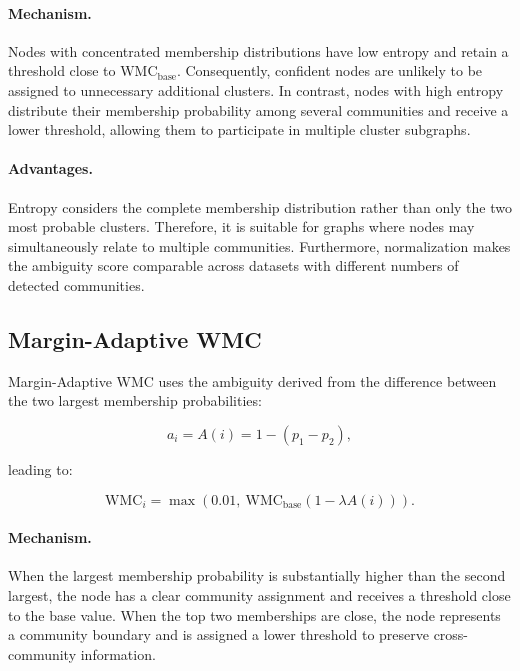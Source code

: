 \documentclass[pdflatex,sn-mathphys-num]{sn-jnl}%
\theoremstyle{thmstyleone}%
\theoremstyle{thmstyletwo}%
\theoremstyle{thmstylethree}%
\begin{document}
\paragraph{Mechanism.}

Nodes with concentrated membership distributions have low entropy and retain a threshold close to $\mathrm{WMC}_{\mathrm{base}}$.
Consequently, confident nodes are unlikely to be assigned to unnecessary additional clusters.
In contrast, nodes with high entropy distribute their membership probability among several communities and receive a lower threshold, allowing them to participate in multiple cluster subgraphs.

\paragraph{Advantages.}

Entropy considers the complete membership distribution rather than only the two most probable clusters.
Therefore, it is suitable for graphs where nodes may simultaneously relate to multiple communities.
Furthermore, normalization makes the ambiguity score comparable across datasets with different numbers of detected communities.

\subsection{Margin-Adaptive WMC}
\label{subsec:margin-adaptive}

Margin-Adaptive WMC uses the ambiguity derived from the difference between the two largest membership probabilities:

\begin{equation}
a_i=A(i)=1-(p_1-p_2),
\label{eq:margin-score}
\end{equation}

leading to:

\begin{equation}
\mathrm{WMC}_i =
\max\left(0.01,\ \mathrm{WMC}_{\mathrm{base}}
(1-\lambda A(i))\right).
\label{eq:margin-adaptive}
\end{equation}

\paragraph{Mechanism.}

When the largest membership probability is substantially higher than the second largest, the node has a clear community assignment and receives a threshold close to the base value.
When the top two memberships are close, the node represents a community boundary and is assigned a lower threshold to preserve cross-community information.
\end{document}
